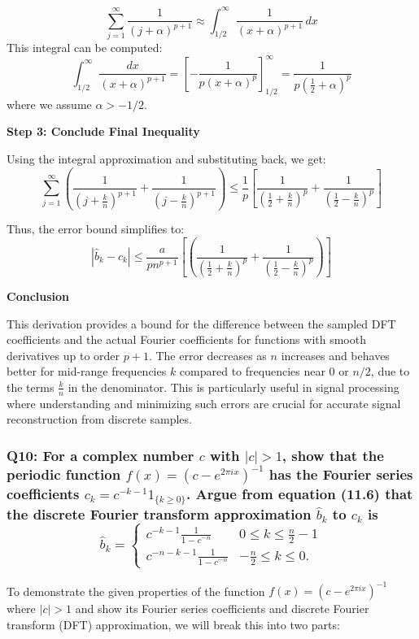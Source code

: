 \documentclass[8pt]{article}
\begin{document}
\[ \sum_{j=1}^\infty \frac{1}{(j + \alpha)^{p+1}} \approx \int_{1/2}^\infty \frac{1}{(x + \alpha)^{p+1}} \, dx \]
This integral can be computed:
\[ \int_{1/2}^\infty \frac{dx}{(x + \alpha)^{p+1}} = \left[ -\frac{1}{p(x + \alpha)^p} \right]_{1/2}^\infty = \frac{1}{p \left(\frac{1}{2} + \alpha\right)^p} \]
where we assume \( \alpha > -1/2 \).

\textbf{Step 3: Conclude Final Inequality}

Using the integral approximation and substituting back, we get:
\[ \sum_{j=1}^\infty \left( \frac{1}{(j + \frac{k}{n})^{p+1}} + \frac{1}{(j - \frac{k}{n})^{p+1}} \right) \leq \frac{1}{p} \left[ \frac{1}{\left(\frac{1}{2} + \frac{k}{n}\right)^p} + \frac{1}{\left(\frac{1}{2} - \frac{k}{n}\right)^p} \right] \]

Thus, the error bound simplifies to:
\[
|\hat{b}_k - c_k| \leq \frac{a}{pn^{p+1}} \left[ \left( \frac{1}{\left( \frac{1}{2} + \frac{k}{n} \right)^p} + \frac{1}{\left( \frac{1}{2} - \frac{k}{n} \right)^p} \right) \right]
\]


\textbf{Conclusion}

This derivation provides a bound for the difference between the sampled DFT coefficients and the actual Fourier coefficients for functions with smooth derivatives up to order \(p+1\). The error decreases as \(n\) increases and behaves better for mid-range frequencies \(k\) compared to frequencies near \(0\) or \(n/2\), due to the terms \(\frac{k}{n}\) in the denominator. This is particularly useful in signal processing where understanding and minimizing such errors are crucial for accurate signal reconstruction from discrete samples.

\subsubsection*{Q10:
For a complex number \(c\) with \(|c| > 1\), show that the periodic function \(f(x) = (c - e^{2\pi ix})^{-1}\) has the Fourier series coefficients \(c_k = c^{-k-1}1_{\{k \geq 0\}}\). Argue from equation (11.6) that the discrete Fourier transform approximation \(\hat{b}_k\) to \(c_k\) is
\[
\hat{b}_k = \begin{cases}
c^{-k-1} \frac{1}{1 - c^{-n}} & 0 \leq k \leq \frac{n}{2} - 1 \\
c^{-n-k-1} \frac{1}{1 - c^{-n}} & -\frac{n}{2} \leq k \leq 0.
\end{cases}
\]}

To demonstrate the given properties of the function \(f(x) = (c - e^{2\pi ix})^{-1}\) where \(|c| > 1\) and show its Fourier series coefficients and discrete Fourier transform (DFT) approximation, we will break this into two parts:
\end{document}
